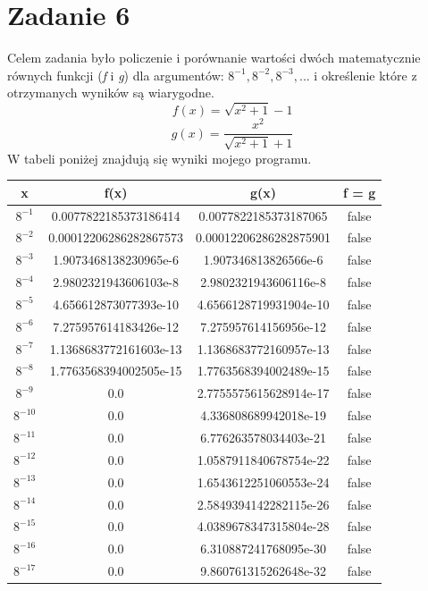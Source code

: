 \documentclass[]{article}
\begin{document}
	\section*{Zadanie 6}
	
	Celem zadania było policzenie i porównanie wartości dwóch matematycznie równych funkcji (\textit{f} i \textit{g}) dla argumentów: \(8^{-1}, 8^{-2}, 8^{-3}, ...\) i określenie które z otrzymanych wyników są wiarygodne.
	\[f(x) = \sqrt{x^2 + 1} - 1\]
	\[g(x) = \frac{x^2}{\sqrt{x^2 + 1} + 1}\]
	W tabeli poniżej znajdują się wyniki mojego programu.
	\begin{table}[!h]
		\centering
		\label{tab:table1}
		\begin{tabular}{|c|c|c|c|}
			\hline
			x & f(x) & g(x) & f = g \\ \hline
			$8^{-1}$ & 0.0077822185373186414 & 0.0077822185373187065 & false \\ \hline
			$8^{-2}$ & 0.00012206286282867573 & 0.00012206286282875901 & false \\ \hline
			$8^{-3}$ & 1.9073468138230965e-6 & 1.907346813826566e-6 & false \\ \hline
			$8^{-4}$ & 2.9802321943606103e-8 & 2.9802321943606116e-8 & false \\ \hline
			$8^{-5}$ & 4.656612873077393e-10 & 4.6566128719931904e-10 & false \\ \hline
			$8^{-6}$ & 7.275957614183426e-12 & 7.275957614156956e-12 & false \\ \hline
			$8^{-7}$ & 1.1368683772161603e-13 & 1.1368683772160957e-13 & false \\ \hline
			$8^{-8}$ & 1.7763568394002505e-15 & 1.7763568394002489e-15 & false \\ \hline
			$8^{-9}$ & 0.0 & 2.7755575615628914e-17 & false \\ \hline
			$8^{-10}$ & 0.0 & 4.336808689942018e-19 & false \\ \hline
			$8^{-11}$ & 0.0 & 6.776263578034403e-21 & false \\ \hline
			$8^{-12}$ & 0.0 & 1.0587911840678754e-22 & false \\ \hline
			$8^{-13}$ & 0.0 & 1.6543612251060553e-24 & false \\ \hline
			$8^{-14}$ & 0.0 & 2.5849394142282115e-26 & false \\ \hline
			$8^{-15}$ & 0.0 & 4.0389678347315804e-28 & false \\ \hline
			$8^{-16}$ & 0.0 & 6.310887241768095e-30 & false \\ \hline
			$8^{-17}$ & 0.0 & 9.860761315262648e-32 & false \\ \hline

\end{tabular}
\end{table}
\end{document}
